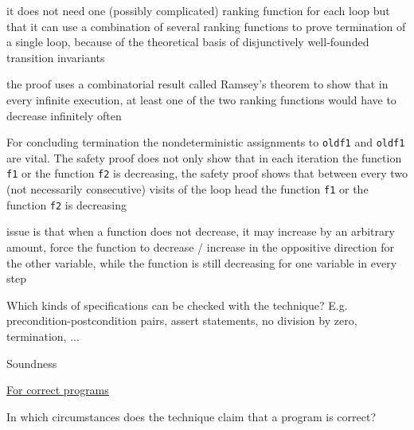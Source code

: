 \documentclass[a4paper]{article}
\begin{document}
\begin{minipage}[t]{0.16\linewidth}
\begin{betterlist}
{{\begin{betterlist}
					\codeone
					\codetwo
					\item it does not need one (possibly complicated) ranking function for each loop but that it can use a combination of several ranking functions to prove termination of a single loop, because of the theoretical basis of disjunctively well-founded transition invariants
          \begin{betterlist}
            \item the proof uses a combinatorial result called Ramsey’s theorem to show that in every infinite execution, at least one of the two ranking functions would have to decrease infinitely often
          \end{betterlist}
          \item For concluding termination the nondeterministic assignments to \texttt{oldf1} and \texttt{oldf1} are vital. The safety proof does not only show that in each iteration the function \texttt{f1} or the function \texttt{f2} is decreasing, the safety proof shows that between every two (not necessarily consecutive) visits of the loop head the function \texttt{f1} or the function \texttt{f2} is decreasing
          \begin{betterlist}
            \item issue is that when a function does not decrease, it may increase by an arbitrary amount, force the function to decrease / increase in the oppositive direction for the other variable, while the function is still decreasing for one variable in every step
          \end{betterlist}
          
            \codefour
				\end{betterlist}
			}}
		\item Which kinds of specifications can be checked with the technique? E.g. precondition-postcondition pairs, assert statements, no division by zero, termination, ...

		\item \alert{Soundness}
		\begin{betterlist}
			\item \underline{For correct programs}
			\begin{betterlist}
				\item In which circumstances does the technique claim that a program is correct?


\end{betterlist}
\end{betterlist}
\end{betterlist}
\end{minipage}
\end{document}
